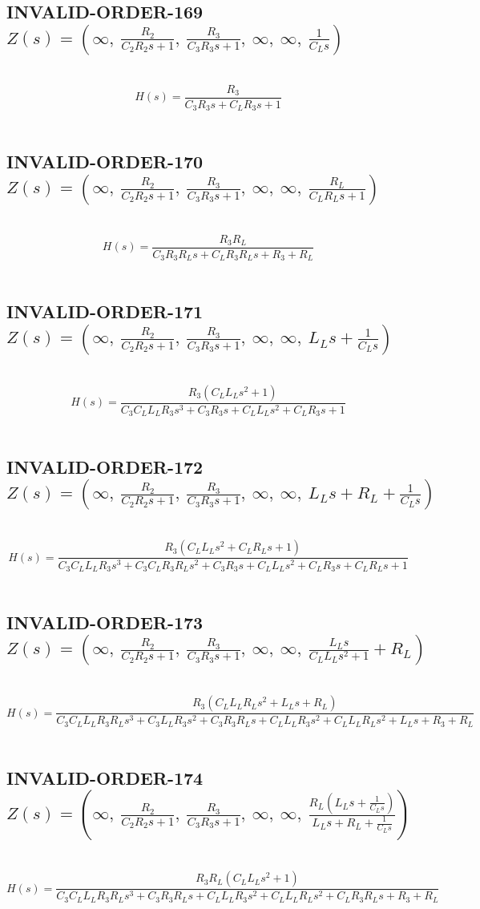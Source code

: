 \documentclass{article}
\begin{document}
\subsection{INVALID-ORDER-169 $Z(s) = \left( \infty, \  \frac{R_{2}}{C_{2} R_{2} s + 1}, \  \frac{R_{3}}{C_{3} R_{3} s + 1}, \  \infty, \  \infty, \  \frac{1}{C_{L} s}\right)$ } \ 
\textbf{\[H(s) = \frac{R_{3}}{C_{3} R_{3} s + C_{L} R_{3} s + 1}\] } \ 
\subsection{INVALID-ORDER-170 $Z(s) = \left( \infty, \  \frac{R_{2}}{C_{2} R_{2} s + 1}, \  \frac{R_{3}}{C_{3} R_{3} s + 1}, \  \infty, \  \infty, \  \frac{R_{L}}{C_{L} R_{L} s + 1}\right)$ } \ 
\textbf{\[H(s) = \frac{R_{3} R_{L}}{C_{3} R_{3} R_{L} s + C_{L} R_{3} R_{L} s + R_{3} + R_{L}}\] } \ 
\subsection{INVALID-ORDER-171 $Z(s) = \left( \infty, \  \frac{R_{2}}{C_{2} R_{2} s + 1}, \  \frac{R_{3}}{C_{3} R_{3} s + 1}, \  \infty, \  \infty, \  L_{L} s + \frac{1}{C_{L} s}\right)$ } \ 
\textbf{\[H(s) = \frac{R_{3} \left(C_{L} L_{L} s^{2} + 1\right)}{C_{3} C_{L} L_{L} R_{3} s^{3} + C_{3} R_{3} s + C_{L} L_{L} s^{2} + C_{L} R_{3} s + 1}\] } \ 
\subsection{INVALID-ORDER-172 $Z(s) = \left( \infty, \  \frac{R_{2}}{C_{2} R_{2} s + 1}, \  \frac{R_{3}}{C_{3} R_{3} s + 1}, \  \infty, \  \infty, \  L_{L} s + R_{L} + \frac{1}{C_{L} s}\right)$ } \ 
\textbf{\[H(s) = \frac{R_{3} \left(C_{L} L_{L} s^{2} + C_{L} R_{L} s + 1\right)}{C_{3} C_{L} L_{L} R_{3} s^{3} + C_{3} C_{L} R_{3} R_{L} s^{2} + C_{3} R_{3} s + C_{L} L_{L} s^{2} + C_{L} R_{3} s + C_{L} R_{L} s + 1}\] } \ 
\subsection{INVALID-ORDER-173 $Z(s) = \left( \infty, \  \frac{R_{2}}{C_{2} R_{2} s + 1}, \  \frac{R_{3}}{C_{3} R_{3} s + 1}, \  \infty, \  \infty, \  \frac{L_{L} s}{C_{L} L_{L} s^{2} + 1} + R_{L}\right)$ } \ 
\textbf{\[H(s) = \frac{R_{3} \left(C_{L} L_{L} R_{L} s^{2} + L_{L} s + R_{L}\right)}{C_{3} C_{L} L_{L} R_{3} R_{L} s^{3} + C_{3} L_{L} R_{3} s^{2} + C_{3} R_{3} R_{L} s + C_{L} L_{L} R_{3} s^{2} + C_{L} L_{L} R_{L} s^{2} + L_{L} s + R_{3} + R_{L}}\] } \ 
\subsection{INVALID-ORDER-174 $Z(s) = \left( \infty, \  \frac{R_{2}}{C_{2} R_{2} s + 1}, \  \frac{R_{3}}{C_{3} R_{3} s + 1}, \  \infty, \  \infty, \  \frac{R_{L} \left(L_{L} s + \frac{1}{C_{L} s}\right)}{L_{L} s + R_{L} + \frac{1}{C_{L} s}}\right)$ } \ 
\textbf{\[H(s) = \frac{R_{3} R_{L} \left(C_{L} L_{L} s^{2} + 1\right)}{C_{3} C_{L} L_{L} R_{3} R_{L} s^{3} + C_{3} R_{3} R_{L} s + C_{L} L_{L} R_{3} s^{2} + C_{L} L_{L} R_{L} s^{2} + C_{L} R_{3} R_{L} s + R_{3} + R_{L}}\] } \ 
\end{document}
